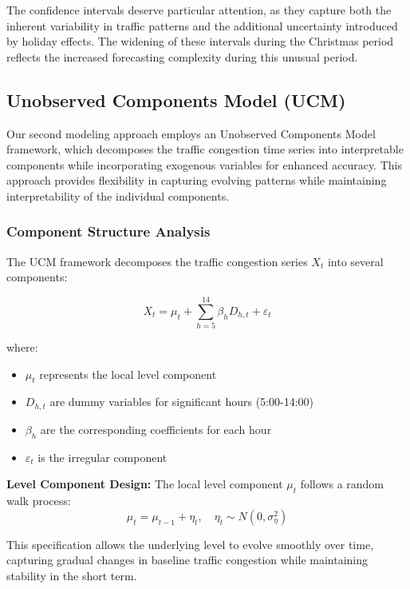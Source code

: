 \documentclass{article}
\begin{document}
The confidence intervals deserve particular attention, as they capture both the inherent variability in traffic patterns and the additional uncertainty introduced by holiday effects. The widening of these intervals during the Christmas period reflects the increased forecasting complexity during this unusual period.

\subsection{Unobserved Components Model (UCM)}

Our second modeling approach employs an Unobserved Components Model framework, which decomposes the traffic congestion time series into interpretable components while incorporating exogenous variables for enhanced accuracy. This approach provides flexibility in capturing evolving patterns while maintaining interpretability of the individual components.

\subsubsection{Component Structure Analysis}
The UCM framework decomposes the traffic congestion series $X_t$ into several components:

\begin{equation}
X_t = \mu_t + \sum_{h=5}^{14} \beta_h D_{h,t} + \varepsilon_t
\end{equation}

where:
\begin{itemize}
    \item $\mu_t$ represents the local level component
    \item $D_{h,t}$ are dummy variables for significant hours (5:00-14:00)
    \item $\beta_h$ are the corresponding coefficients for each hour
    \item $\varepsilon_t$ is the irregular component
\end{itemize}

\textbf{Level Component Design:}
The local level component $\mu_t$ follows a random walk process:
\begin{equation}
\mu_t = \mu_{t-1} + \eta_t, \quad \eta_t \sim N(0, \sigma^2_\eta)
\end{equation}

This specification allows the underlying level to evolve smoothly over time, capturing gradual changes in baseline traffic congestion while maintaining stability in the short term.
\end{document}
